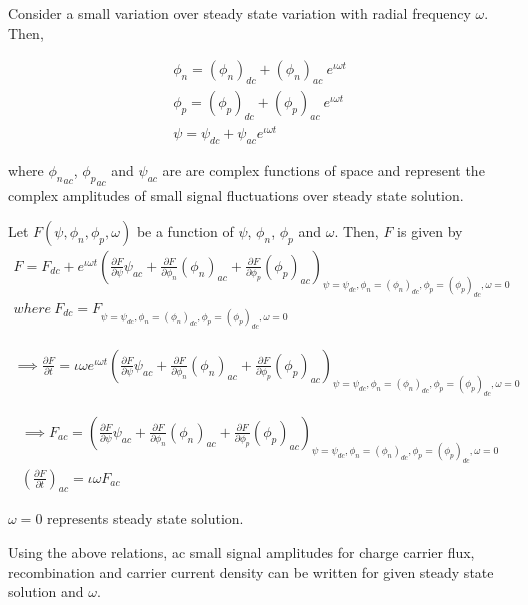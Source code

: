 Consider a small variation over steady state variation with radial frequency $\omega$. Then,

\begin{align*}
\phi_n = ({\phi_n})_{dc} + ({\phi_n})_{ac}\ e^{\iota \omega t} \\
\phi_p = ({\phi_p})_{dc} + ({\phi_p})_{ac}\ e^{\iota \omega t} \\
\psi = \psi_{dc} + \psi_{ac} e^{\iota \omega t}
\end{align*}

where ${\phi_n}_{ac}$, ${\phi_p}_{ac}$ and $\psi_{ac}$ are are complex functions of space and represent the complex amplitudes of small signal fluctuations over steady state solution.

Let $F(\psi,\phi_n,\phi_p,\omega)$ be a function of $\psi$, $\phi_n$, $\phi_p$ and $\omega$. Then, $F$ is given by
\begin{align*}
F = F_{dc} + e^{\iota \omega t} \left({\frac{\partial F}{\partial \psi} \psi_{ac}+ \frac{\partial F}{\partial \phi_n} ({\phi_n})_{ac} +\frac{\partial F}{\partial \phi_p}({\phi_p})_{ac}}\right)_{\psi=\psi_{dc},\phi_n=({\phi_n})_{dc},\phi_p = ({\phi_p})_{dc},\omega=0} \\
where\ F_{dc} = F_{\psi=\psi_{dc},\phi_n=({\phi_n})_{dc},\phi_p = ({\phi_p})_{dc},\omega=0} 
\end{align*}

\begin{align*}
\implies \frac{\partial F}{\partial t} = \iota \omega e^{\iota \omega t} \left({\frac{\partial F}{\partial \psi} \psi_{ac}+ \frac{\partial F}{\partial \phi_n} ({\phi_n})_{ac} +\frac{\partial F}{\partial \phi_p}({\phi_p})_{ac}}\right)_{\psi=\psi_{dc},\phi_n=({\phi_n})_{dc},\phi_p = ({\phi_p})_{dc},\omega=0}
\end{align*}

\begin{align*}
\implies
F_{ac} = \left({\frac{\partial F}{\partial \psi} \psi_{ac}+ \frac{\partial F}{\partial \phi_n} ({\phi_n})_{ac} +\frac{\partial F}{\partial \phi_p}({\phi_p})_{ac}}\right)_{\psi=\psi_{dc},\phi_n=({\phi_n})_{dc},\phi_p = ({\phi_p})_{dc},\omega=0} \\
\left({\frac{\partial F}{\partial t}}\right)_{ac} = \iota \omega F_{ac}
\tag{1.16} \label{eq:ac_derivative}
\end{align*}

$\omega=0$ represents steady state solution.

Using the above relations, ac small signal amplitudes for charge carrier flux, recombination and carrier current density can be written for given steady state solution and $\omega$.

